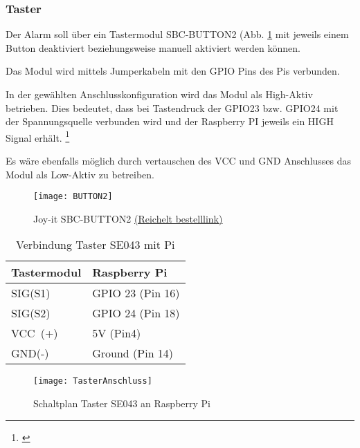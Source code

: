 \documentclass[a4paper,12pt]{article}
\begin{document}
\subsubsection{Taster}

Der Alarm soll über ein Tastermodul SBC-BUTTON2 (Abb. \ref{BUTTON2} mit jeweils einem Button deaktiviert beziehungsweise manuell aktiviert werden können.\par
Das Modul wird mittels Jumperkabeln mit den GPIO Pins des Pis verbunden. \par
In der gewählten Anschlusskonfiguration wird das Modul als High-Aktiv betrieben. Dies bedeutet, dass bei Tastendruck der GPIO23 bzw. GPIO24 mit der Spannungsquelle verbunden wird und der Raspberry PI jeweils ein HIGH Signal erhält. \footnote{\cite{.19.04.2022}}\par 
Es wäre ebenfalls möglich durch vertauschen des VCC und GND Anschlusses das Modul als Low-Aktiv zu betreiben.
	\begin{figure}[h] %
	\centering
	\texttt{[image: BUTTON2]}
	\caption{Joy-it SBC-BUTTON2 \href{https://www.reichelt.de/sg/de/entwicklerboards-2-tasten-modul-debo-button2-p316186.html}{(Reichelt bestelllink)}}
	\label{BUTTON2}
\end{figure}

\begin{table}[H]
	\centering
	\begin{tabular}{|p{5cm}|p{5cm}|} 
		\hline
		Tastermodul & Raspberry Pi\\ 
		\hline
		SIG(S1)                   & GPIO 23 \hspace{0,3cm}(Pin 16)\\
		\hline
		SIG(S2)                   & GPIO 24 \hspace{0,3cm}(Pin 18)\\
		\hline
		VCC~(+)   & 5V \hspace{1,45cm}(Pin\hspace{0,35cm}4)\\ 
		\hline
		GND(-)                   & Ground \hspace{0,6cm}(Pin 14)\\
		\hline
		
\end{tabular}
	\caption{Verbindung Taster SE043 mit Pi} 
\end{table}




	\begin{figure}[H]
	\centering
	\texttt{[image: TasterAnschluss]}
	\caption{Schaltplan Taster SE043 an Raspberry Pi}
	\label{TasterAnschluss}
\end{figure}
\end{document}
